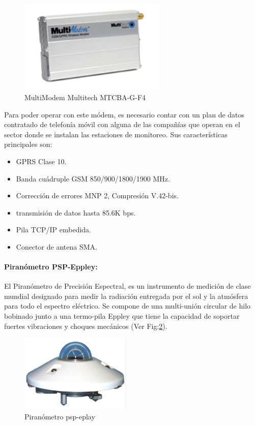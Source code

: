 \begin{figure}[h!]
        \centering
        \includegraphics[width=200pt]{images/MultiModemGPRS}
        \caption{MultiModem Multitech MTCBA-G-F4}
	\label{modem} 
\end{figure}

Para poder operar con este módem, es necesario contar con un plan de datos contratado de telefonía móvil con alguna de las compañías que operan en el sector donde se instalan las estaciones de monitoreo. Sus características principales son:\\

\begin{itemize}
\item GPRS Clase 10.
\item Banda cuádruple GSM 850/900/1800/1900 MHz.
\item Corrección de errores MNP 2, Compresión V.42-bis.
\item transmisión de datos hasta 85.6K bps.
\item Pila TCP/IP embedida.
\item Conector de antena SMA.
\end{itemize}

\paragraph{Piranómetro PSP-Eppley:}
El Piranómetro de Precisión Espectral, es un instrumento de medición de clase mundial designado para medir la radiación entregada por el sol y la atmósfera para todo el espectro eléctrico. Se compone de una multi-unión circular de hilo bobinado junto a una termo-pila Eppley que tiene la capacidad de soportar fuertes vibraciones y choques mecánicos (Ver Fig:\ref{piranometro}).

\begin{figure}[h!]
        \centering
        \includegraphics[width=150pt]{images/piranometro}
        \caption{Piranómetro psp-eplay}
	\label{piranometro}
\end{figure}

